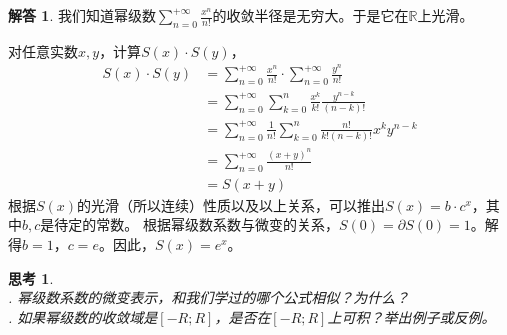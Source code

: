 \documentclass[12pt,UTF8]{ctexbook}
\theoremstyle{definition}
\newtheorem*{so}{解答}
\theoremstyle{plain}
\newtheorem{sk}{思考}[section]
\begin{document}
\begin{so}
    我们知道幂级数$\sum_{n=0}^{+\infty} \frac{x^n}{n!}$的收敛半径是无穷大。于是它在$\mathbb{R}$上光滑。

    对任意实数$x,y$，计算$S(x)\cdot S(y)$，
    \begin{align*}
        S(x)\cdot S(y) &= \sum_{n=0}^{+\infty} \frac{x^n}{n!} \cdot \sum_{n=0}^{+\infty} \frac{y^n}{n!} \\
        &= \sum_{n=0}^{+\infty} \sum_{k=0}^{n} \frac{x^k}{k!} \frac{y^{n-k}}{(n-k)!} \\
        &= \sum_{n=0}^{+\infty} \frac{1}{n!} \sum_{k=0}^{n} \frac{n!}{k!(n-k)!} x^ky^{n-k} \\
        &= \sum_{n=0}^{+\infty} \frac{(x + y)^n}{n!} \\
        &= S(x + y)
    \end{align*}
    根据$S(x)$的光滑（所以连续）性质以及以上关系，可以推出$S(x) = b\cdot c^x$，其中$b,c$是待定的常数。
    根据幂级数系数与微变的关系，$S(0) = \partial S(0) = 1$。解得$b=1$，$c=e$。因此，$S(x) = e^x$。
\end{so}


\begin{sk}
    \mbox{} \\
    . 幂级数系数的微变表示，和我们学过的哪个公式相似？为什么？\\
    . 如果幂级数的收敛域是$[-R;R]$，是否在$[-R;R]$上可积？举出例子或反例。
\end{sk}
\end{document}
